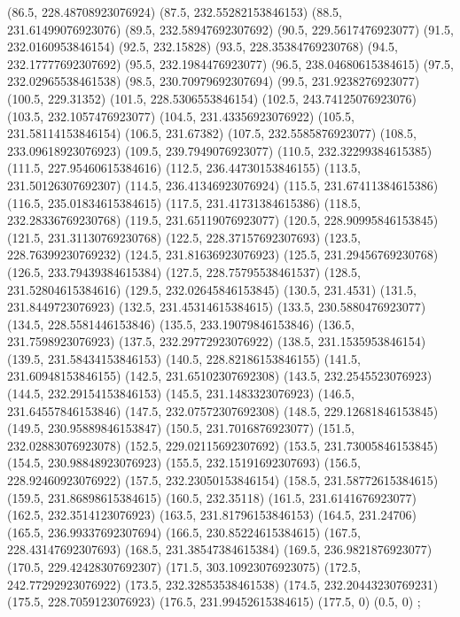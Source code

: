 {{{		(86.5, 228.48708923076924)
		(87.5, 232.55282153846153)
		(88.5, 231.61499076923076)
		(89.5, 232.58947692307692)
		(90.5, 229.5617476923077)
		(91.5, 232.0160953846154)
		(92.5, 232.15828)
		(93.5, 228.35384769230768)
		(94.5, 232.17777692307692)
		(95.5, 232.1984476923077)
		(96.5, 238.04680615384615)
		(97.5, 232.02965538461538)
		(98.5, 230.70979692307694)
		(99.5, 231.9238276923077)
		(100.5, 229.31352)
		(101.5, 228.5306553846154)
		(102.5, 243.74125076923076)
		(103.5, 232.1057476923077)
		(104.5, 231.43356923076922)
		(105.5, 231.58114153846154)
		(106.5, 231.67382)
		(107.5, 232.5585876923077)
		(108.5, 233.09618923076923)
		(109.5, 239.7949076923077)
		(110.5, 232.32299384615385)
		(111.5, 227.95460615384616)
		(112.5, 236.44730153846155)
		(113.5, 231.50126307692307)
		(114.5, 236.41346923076924)
		(115.5, 231.67411384615386)
		(116.5, 235.01834615384615)
		(117.5, 231.41731384615386)
		(118.5, 232.28336769230768)
		(119.5, 231.65119076923077)
		(120.5, 228.90995846153845)
		(121.5, 231.31130769230768)
		(122.5, 228.37157692307693)
		(123.5, 228.76399230769232)
		(124.5, 231.81636923076923)
		(125.5, 231.29456769230768)
		(126.5, 233.79439384615384)
		(127.5, 228.75795538461537)
		(128.5, 231.52804615384616)
		(129.5, 232.02645846153845)
		(130.5, 231.4531)
		(131.5, 231.8449723076923)
		(132.5, 231.45314615384615)
		(133.5, 230.5880476923077)
		(134.5, 228.5581446153846)
		(135.5, 233.19079846153846)
		(136.5, 231.7598923076923)
		(137.5, 232.29772923076922)
		(138.5, 231.1535953846154)
		(139.5, 231.58434153846153)
		(140.5, 228.82186153846155)
		(141.5, 231.60948153846155)
		(142.5, 231.65102307692308)
		(143.5, 232.2545523076923)
		(144.5, 232.29154153846153)
		(145.5, 231.1483323076923)
		(146.5, 231.64557846153846)
		(147.5, 232.07572307692308)
		(148.5, 229.12681846153845)
		(149.5, 230.95889846153847)
		(150.5, 231.7016876923077)
		(151.5, 232.02883076923078)
		(152.5, 229.02115692307692)
		(153.5, 231.73005846153845)
		(154.5, 230.98848923076923)
		(155.5, 232.15191692307693)
		(156.5, 228.92460923076922)
		(157.5, 232.23050153846154)
		(158.5, 231.58772615384615)
		(159.5, 231.86898615384615)
		(160.5, 232.35118)
		(161.5, 231.6141676923077)
		(162.5, 232.3514123076923)
		(163.5, 231.81796153846153)
		(164.5, 231.24706)
		(165.5, 236.99337692307694)
		(166.5, 230.85224615384615)
		(167.5, 228.43147692307693)
		(168.5, 231.38547384615384)
		(169.5, 236.9821876923077)
		(170.5, 229.42428307692307)
		(171.5, 303.10923076923075)
		(172.5, 242.77292923076922)
		(173.5, 232.32853538461538)
		(174.5, 232.20443230769231)
		(175.5, 228.7059123076923)
		(176.5, 231.99452615384615)
		(177.5, 0)
		(0.5, 0)
	};

}}
